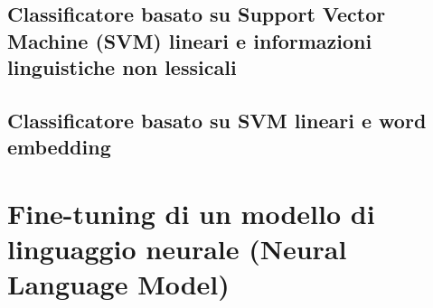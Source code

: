 \documentclass[a4paper,12pt]{report}
\begin{document}
    \section{Classificatore basato su Support Vector Machine (SVM) lineari
    e informazioni linguistiche non lessicali}


    \section{Classificatore basato su SVM lineari e word embedding}

    \chapter{Fine-tuning di un modello di linguaggio neurale (Neural Language Model)}

    
    
    
    
    
    
    
    
    
    
    
    
    
    
    
\end{document}
